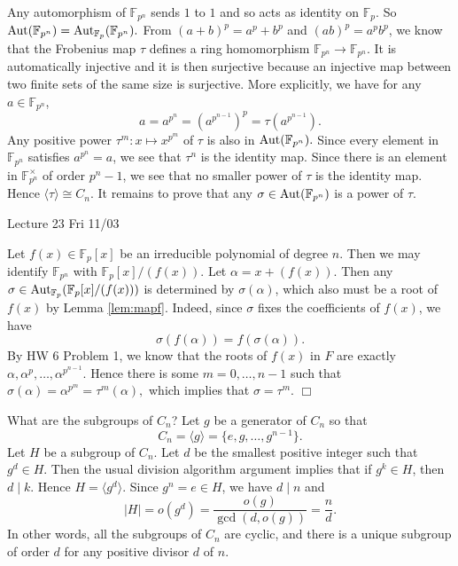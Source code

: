 \documentclass{article}
\def\Aut{{\rm Aut}}
\def\F{{\mathbb F}}
\def\F{{\mathbb F}}
\newenvironment{proof}{\noindent {\bf Proof:}}{$\Box$ \vspace{2 ex}}
\newcommand{\add}[1]{{\color{blue} #1}}
\begin{document}
    \begin{proof}
        Any automorphism of $\F_{p^n}$ sends $1$ to $1$ and so acts as identity on $\F_p$. So $\Aut(\F_{p^n}) = \Aut_{\F_p}(\F_{p^n}).$ From $(a+b)^p = a^p + b^p$ and $(ab)^p = a^pb^p$, we know that the Frobenius map $\tau$ defines a ring homomorphism $\F_{p^n}\rightarrow\F_{p^n}$. It is automatically injective and it is then surjective because an injective map between two finite sets of the same size is surjective. More explicitly, we have for any $a\in \F_{p^n}$, $$a = a^{p^n} = (a^{p^{n-1}})^p = \tau(a^{p^{n-1}}).$$ Any positive power $\tau^m:x\mapsto x^{p^m}$ of $\tau$ is also in $\Aut(\F_{p^n}).$ Since every element in $\F_{p^n}$ satisfies $a^{p^n} = a$, we see that $\tau^n$ is the identity map. Since there is an element in $\F_{p^n}^\times$ of order $p^n - 1$, we see that no smaller power of $\tau$ is the identity map. Hence $\langle \tau\rangle \cong C_n$. It remains to prove that any $\sigma\in\Aut(\F_{p^n})$ is a power of $\tau$.

\begin{center}
    \add{Lecture 23 Fri 11/03}
\end{center}
        
        Let $f(x)\in\F_p[x]$ be an irreducible polynomial of degree $n$. Then we may identify $\F_{p^n}$ with $\F_p[x]/(f(x))$. Let $\alpha = x + (f(x))$. Then any $\sigma\in\Aut_{\F_p}(\F_p[x]/(f(x)))$ is determined by $\sigma(\alpha)$, which also must be a root of $f(x)$ by Lemma \ref{lem:mapf}. Indeed, since $\sigma$ fixes the coefficients of $f(x)$, we have
        $$\sigma(f(\alpha)) = f(\sigma(\alpha)).$$ By HW 6 Problem 1, we know that the roots of $f(x)$ in $F$ are exactly $\alpha, \alpha^p,\ldots,\alpha^{p^{n-1}}.$ Hence there is some $m = 0,\ldots,n-1$ such that $\sigma(\alpha) = \alpha^{p^m} = \tau^m(\alpha),$ which implies that $\sigma = \tau^m.$ 
    \end{proof}



What are the subgroups of $C_n$? Let $g$ be a generator of $C_n$ so that $$C_n = \langle g\rangle = \{e,g,\ldots,g^{n-1}\}.$$
Let $H$ be a subgroup of $C_n$. Let $d$ be the smallest positive integer such that $g^d\in H$. Then the usual division algorithm argument implies that if $g^k\in H$, then $d\mid k$. Hence $H = \langle g^d \rangle$. Since $g^n = e\in H$, we have $d\mid n$ and $$|H| = o(g^d) = \frac{o(g)}{\gcd(d, o(g))} = \frac{n}{d}.$$
In other words, all the subgroups of $C_n$ are cyclic, and there is a unique subgroup of order $d$ for any positive divisor $d$ of $n$.
\end{document}
